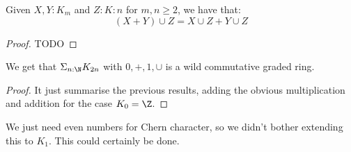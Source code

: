 \begin{lemma}
Given $X,Y:K_m$ and $Z:K:n$ for $m,n\geq 2$, we have that:
\[(X+Y)\cup Z = X\cup Z + Y\cup Z\]
\end{lemma}

\begin{proof}
TODO
\end{proof}

\begin{proposition}
We get that $\Sigma_{n:\N}K_{2n}$ with $0,+,1,\cup$ is a wild commutative graded ring.
\end{proposition}

\begin{proof}
It just summarise the previous results, adding the obvious multiplication and addition for the case $K_0 = \Z$.
\end{proof}

\begin{remark}
We just need even numbers for Chern character, so we didn't bother extending this to $K_1$. This could certainly be done.
\end{remark}


